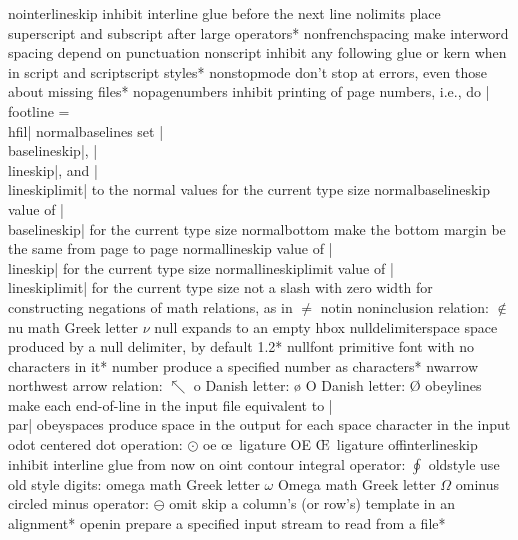 \capcs nointerlineskip {inhibit interline glue before the next line}{}{}
\capcs nolimits {place superscript and subscript after large operators}*{}
\capcs nonfrenchspacing {make interword spacing depend on punctuation}{}{}
\capcs nonscript {inhibit any following glue or kern when
   in script and scriptscript styles}*{}
\capcs nonstopmode {don't stop at errors, even those about missing files}*{}
\capcs nopagenumbers {inhibit printing of page numbers, i.e., do
   |\\footline = {\\hfil}|}{}{}
\capcs normalbaselines {set |\\baselineskip|, |\\line\-skip|, and
   |\\line\-skip\-limit| to the normal values for the current type size}{}{}
\capcs normalbaselineskip {value of |\\baselineskip| for the
   current type size}{}{}
\capcs normalbottom {make the bottom margin be the same from page to page}{}{}
\capcs normallineskip {value of |\\lineskip| for the current type
   size}{}{}
\capcs normallineskiplimit {value of |\\lineskiplimit| for the
   current type size}{}{}
\capcs not {a slash with zero width for constructing negations of math
   relations, as in $\not=$}{}{}
\capcs notin {noninclusion relation: $\notin$}{}{}
\capcs nu {math Greek letter $\nu$}{}{}
\capcs null {expands to an empty hbox}{}{}
\capcs nulldelimiterspace {space produced by a null delimiter, by 
   default 1.2\pt}*{}
\capcs nullfont {primitive font with no characters in it}*{}
\capcs number {produce a specified number as characters}*{}
\capcs nwarrow {northwest arrow relation: $\nwarrow$}{}{}
\capcs o {Danish letter: \o}{}{}
\capcs O {Danish letter: \O}{}{}
\capcs obeylines {make each end-of-line in the input file 
   equivalent to |\\par|}{}{}
\capcs obeyspaces {produce space in the output for each space character in the
   input}{}{}
\capcs odot {centered dot operation: $\odot$}{}{}
\capcs oe {\oe\ ligature}{}{}
\capcs OE {\OE\ ligature}{}{}
\capcs offinterlineskip {inhibit interline glue from now on}{}{}
\capcs oint {contour integral operator: $\oint$}{}{}
\capcs oldstyle {use old style digits: {}}{}{}
\capcs omega {math Greek letter $\omega$}{}{}
\capcs Omega {math Greek letter $\Omega$}{}{}
\capcs ominus {circled minus operator: $\ominus$}{}{}
\capcs omit {skip a column's (or row's) template in an alignment}*{}
\capcs openin {prepare a specified input stream to read from a file}*{}
